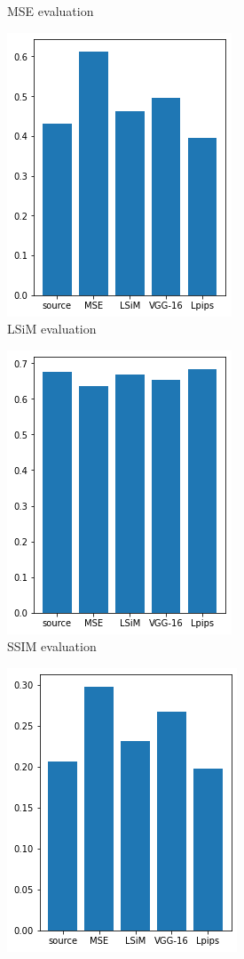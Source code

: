 \documentclass[a4paper,12pt,twoside]{report}
\begin{document}
\begin{figure}
\begin{subfigure}{0.32\textwidth}
		\caption{MSE evaluation}
	\end{subfigure}
	\begin{subfigure}{0.32\textwidth}
		\centering
		\includegraphics[scale=0.48]{buoyancy_test/lsim.png}
		\caption{LSiM evaluation}
	\end{subfigure}
	\begin{subfigure}{0.32\textwidth}
		\centering
		\includegraphics[scale=0.48]{buoyancy_test/ssim.png}
		\caption{SSIM evaluation}
	\end{subfigure}
	\begin{subfigure}{0.32\textwidth}
		\centering
		\includegraphics[scale=0.48]{buoyancy_test/lpips.png}

\end{subfigure}
\end{figure}
\end{document}
